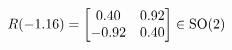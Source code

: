 \documentclass[preview]{standalone}
\begin{document}
\begin{align*}
\special{dvisvgm:raw <g id='unique000'>}R(-1.16) = \begin{bmatrix} 0.40 & 0.92 \\ -0.92 & 0.40 \end{bmatrix} \in \text{SO}(2)\special{dvisvgm:raw </g>}
\end{align*}
\end{document}
